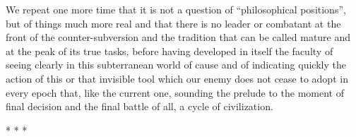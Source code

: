 We repeat one more time that it is not a question of ``philosophical positions'', but of things much more real and that there is no leader or combatant at the front of the counter-subversion and the tradition that can be called mature and at the peak of its true tasks, before having developed in itself the faculty of seeing clearly in this subterranean world of cause and of indicating quickly the action of this or that invisible tool which our enemy does not cease to adopt in every epoch that, like the current one, sounding the prelude to the moment of final decision and the final battle of all, a cycle of civilization.



\begin{center}* * *\end{center}

